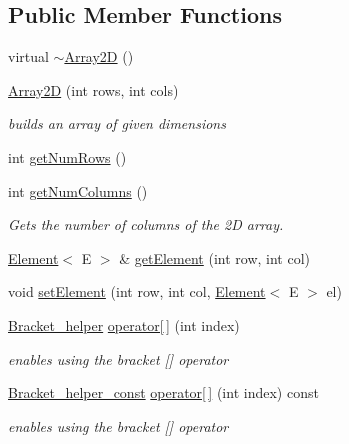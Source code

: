 \subsection*{Public Member Functions}
\begin{DoxyCompactItemize}
\item 
virtual \mbox{\hyperlink{classbridges_1_1datastructure_1_1_array2_d_a6ec24f33b8420735ac7545956afc6dab}{$\sim$\+Array2D}} ()
\item 
\mbox{\hyperlink{classbridges_1_1datastructure_1_1_array2_d_ad65bbb54e829788fee9563a67ffa309c}{Array2D}} (int rows, int cols)
\begin{DoxyCompactList}\small\item\em builds an array of given dimensions \end{DoxyCompactList}\item 
int \mbox{\hyperlink{classbridges_1_1datastructure_1_1_array2_d_afb18017e8a49c0579a90cf22b6dc4c9e}{get\+Num\+Rows}} ()
\item 
int \mbox{\hyperlink{classbridges_1_1datastructure_1_1_array2_d_a0a33557d828d9617871c62a7522817ed}{get\+Num\+Columns}} ()
\begin{DoxyCompactList}\small\item\em Gets the number of columns of the 2D array. \end{DoxyCompactList}\item 
\mbox{\hyperlink{classbridges_1_1datastructure_1_1_element}{Element}}$<$ E $>$ \& \mbox{\hyperlink{classbridges_1_1datastructure_1_1_array2_d_afaa0bcbf06170929d92659314ff2b38d}{get\+Element}} (int row, int col)
\item 
void \mbox{\hyperlink{classbridges_1_1datastructure_1_1_array2_d_a2bd2ef3a200e4a07a4d45534bd31387d}{set\+Element}} (int row, int col, \mbox{\hyperlink{classbridges_1_1datastructure_1_1_element}{Element}}$<$ E $>$ el)
\item 
\mbox{\hyperlink{structbridges_1_1datastructure_1_1_array2_d_1_1_bracket__helper}{Bracket\+\_\+helper}} \mbox{\hyperlink{classbridges_1_1datastructure_1_1_array2_d_a38dfa405595de87a9730c3a951fb85ef}{operator\mbox{[}$\,$\mbox{]}}} (int index)
\begin{DoxyCompactList}\small\item\em enables using the bracket \mbox{[}\mbox{]} operator \end{DoxyCompactList}\item 
\mbox{\hyperlink{structbridges_1_1datastructure_1_1_array2_d_1_1_bracket__helper__const}{Bracket\+\_\+helper\+\_\+const}} \mbox{\hyperlink{classbridges_1_1datastructure_1_1_array2_d_a427adc67a85ec12e765199448ac82ec2}{operator\mbox{[}$\,$\mbox{]}}} (int index) const
\begin{DoxyCompactList}\small\item\em enables using the bracket \mbox{[}\mbox{]} operator \end{DoxyCompactList}\end{DoxyCompactItemize}
